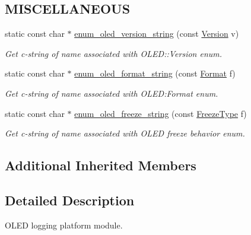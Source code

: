 \subsection*{M\+I\+S\+C\+E\+L\+L\+A\+N\+E\+O\+US}
\begin{DoxyCompactItemize}
\item 
static const char $\ast$ \hyperlink{class_loom___o_l_e_d_a34e7751ffe7f5fdfa8d5c3adde2aedd7}{enum\+\_\+oled\+\_\+version\+\_\+string} (const \hyperlink{class_loom___o_l_e_d_aaf40c7e29901e7130f86046a26cb7400}{Version} v)
\begin{DoxyCompactList}\small\item\em Get c-\/string of name associated with O\+L\+E\+D\+::\+Version enum. \end{DoxyCompactList}\item 
static const char $\ast$ \hyperlink{class_loom___o_l_e_d_a7203f388d5c2eda2dee6aa27c3ab72ad}{enum\+\_\+oled\+\_\+format\+\_\+string} (const \hyperlink{class_loom___o_l_e_d_aade282dab7eb118271f73b3b3bfc0ffd}{Format} f)
\begin{DoxyCompactList}\small\item\em Get c-\/string of name associated with O\+L\+ED\+:Format enum. \end{DoxyCompactList}\item 
static const char $\ast$ \hyperlink{class_loom___o_l_e_d_a4c44f95a1aeade637a671ae365c13871}{enum\+\_\+oled\+\_\+freeze\+\_\+string} (const \hyperlink{class_loom___o_l_e_d_adedc20c1c901fe472d976c722abf0bb9}{Freeze\+Type} f)
\begin{DoxyCompactList}\small\item\em Get c-\/string of name associated with O\+L\+ED freeze behavior enum. \end{DoxyCompactList}\end{DoxyCompactItemize}
\subsection*{Additional Inherited Members}


\subsection{Detailed Description}
O\+L\+ED logging platform module. 

